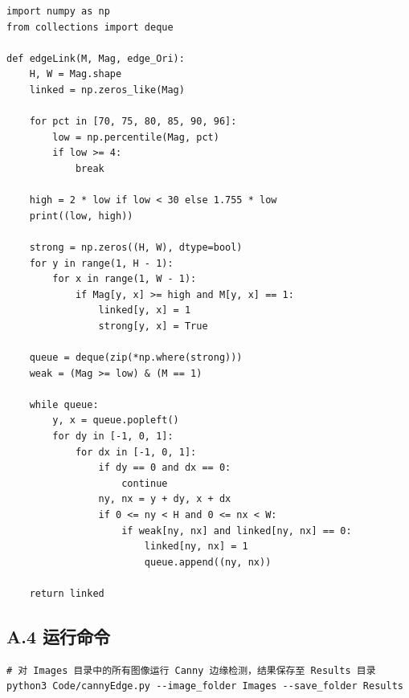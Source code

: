 \documentclass[12pt,a4paper]{ctexart}
\begin{document}
\begin{lstlisting}
import numpy as np
from collections import deque

def edgeLink(M, Mag, edge_Ori):
    H, W = Mag.shape
    linked = np.zeros_like(Mag)

    for pct in [70, 75, 80, 85, 90, 96]:
        low = np.percentile(Mag, pct)
        if low >= 4:
            break

    high = 2 * low if low < 30 else 1.755 * low
    print((low, high))

    strong = np.zeros((H, W), dtype=bool)
    for y in range(1, H - 1):
        for x in range(1, W - 1):
            if Mag[y, x] >= high and M[y, x] == 1:
                linked[y, x] = 1
                strong[y, x] = True

    queue = deque(zip(*np.where(strong)))
    weak = (Mag >= low) & (M == 1)

    while queue:
        y, x = queue.popleft()
        for dy in [-1, 0, 1]:
            for dx in [-1, 0, 1]:
                if dy == 0 and dx == 0:
                    continue
                ny, nx = y + dy, x + dx
                if 0 <= ny < H and 0 <= nx < W:
                    if weak[ny, nx] and linked[ny, nx] == 0:
                        linked[ny, nx] = 1
                        queue.append((ny, nx))

    return linked
\end{lstlisting}

\subsection*{A.4 运行命令}

\begin{verbatim}
# 对 Images 目录中的所有图像运行 Canny 边缘检测，结果保存至 Results 目录
python3 Code/cannyEdge.py --image_folder Images --save_folder Results
\end{verbatim}
\end{document}
